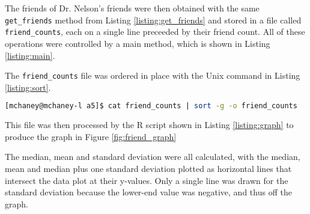 The friends of Dr. Nelson's friends were then obtained with the same {\tt get\_friends} method from Listing \ref{listing:get_friends} and stored in a file called {\tt friend\_counts}, each on a single line preceeded by their friend count. All of these operations were controlled by a main method, which is shown in Listing \ref{listing:main}.

% 

\clearpage

The {\tt friend\_counts} file was ordered in place with the Unix command in Listing \ref{listing:sort}. 

\begin{lstlisting}[language=Bash,caption={Sort command},label=listing:sort]
[mchaney@mchaney-l a5]$ cat friend_counts | sort -g -o friend_counts
\end{lstlisting}

This file was then processed by the R script shown in Listing \ref{listing:graph} to produce the graph in Figure \ref{fig:friend_graph}

% 

\clearpage
The median, mean and standard deviation were all calculated, with the median, mean and median plus one standard deviation plotted as horizontal lines that intersect the data plot at their y-values. Only a single line was drawn for the standard deviation because the lower-end value was negative, and thus off the graph. 

